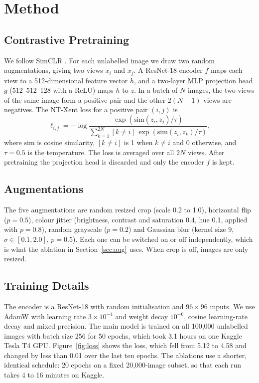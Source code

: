 \documentclass[twoside,a4paper,11pt]{article}
\begin{document}
\section{Method}
\label{sec:method}

\subsection{Contrastive Pretraining}

We follow SimCLR \cite{chen2020simclr}. For each unlabelled image we draw two random
augmentations, giving two views $x_i$ and $x_j$. A ResNet-18 encoder $f$ maps each view
to a 512-dimensional feature vector $h$, and a two-layer MLP projection head $g$
(512--512--128 with a ReLU) maps $h$ to $z$. In a batch of $N$ images, the two views of
the same image form a positive pair and the other $2(N-1)$ views are negatives. The
NT-Xent loss for a positive pair $(i,j)$ is
\begin{equation}
  \ell_{i,j} = -\log \frac{\exp(\mathrm{sim}(z_i, z_j)/\tau)}
  {\sum_{k=1}^{2N} [k \neq i]\, \exp(\mathrm{sim}(z_i, z_k)/\tau)},
\end{equation}
where $\mathrm{sim}$ is cosine similarity, $[k \neq i]$ is 1 when $k \neq i$ and 0
otherwise, and $\tau = 0.5$ is the temperature. The loss is averaged over all $2N$
views. After pretraining the projection head is discarded and only the encoder $f$ is
kept.

\subsection{Augmentations}

The five augmentations are random resized crop (scale 0.2 to 1.0), horizontal flip
($p=0.5$), colour jitter (brightness, contrast and saturation 0.4, hue 0.1, applied
with $p=0.8$), random grayscale ($p=0.2$) and Gaussian blur (kernel size 9,
$\sigma \in [0.1, 2.0]$, $p=0.5$). Each one can be switched on or off independently,
which is what the ablation in Section~\ref{sec:aug} uses. When crop is off, images are
only resized.

\subsection{Training Details}

The encoder is a ResNet-18 with random initialisation and $96\times96$ inputs. We use
AdamW \cite{loshchilov2019adamw} with learning rate $3\times10^{-4}$ and weight decay
$10^{-6}$, cosine learning-rate decay and mixed precision. The main model is trained on
all 100,000 unlabelled images with batch size 256 for 50 epochs, which took 3.1 hours
on one Kaggle Tesla T4 GPU. Figure~\ref{fig:loss} shows the loss, which fell from 5.12
to 4.58 and changed by less than 0.01 over the last ten epochs. The ablations use a
shorter, identical schedule: 20 epochs on a fixed 20,000-image subset, so that each run
takes 4 to 16 minutes on Kaggle.
\end{document}
